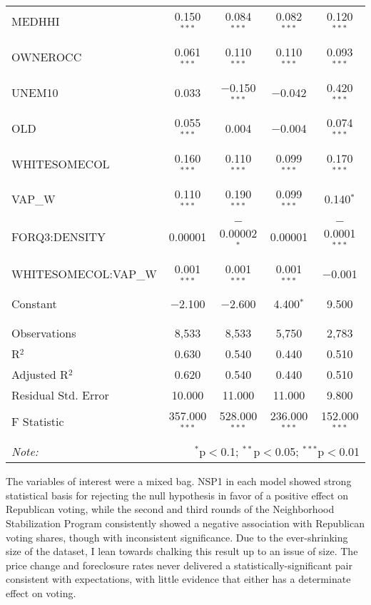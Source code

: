 \documentclass[
]{article}
\begin{document}
\begin{table}[!htbp]
\begin{tabular}{@{\extracolsep{3pt}}lcccc}
 MEDHHI & 0.150$^{***}$ & 0.084$^{***}$ & 0.082$^{***}$ & 0.120$^{***}$ \\
  & & & & \\
 OWNEROCC & 0.061$^{***}$ & 0.110$^{***}$ & 0.110$^{***}$ & 0.093$^{***}$ \\
  & & & & \\
 UNEM10 & 0.033 & $-$0.150$^{***}$ & $-$0.042 & 0.420$^{***}$ \\
  & & & & \\
 OLD & 0.055$^{***}$ & 0.004 & $-$0.004 & 0.074$^{***}$ \\
  & & & & \\
 WHITESOMECOL & 0.160$^{***}$ & 0.110$^{***}$ & 0.099$^{***}$ & 0.170$^{***}$ \\
  & & & & \\
 VAP\_W & 0.110$^{***}$ & 0.190$^{***}$ & 0.099$^{***}$ & 0.140$^{*}$ \\
  & & & & \\
 FORQ3:DENSITY & 0.00001 & $-$0.00002$^{*}$ & 0.00001 & $-$0.0001$^{***}$ \\
  & & & & \\
 WHITESOMECOL:VAP\_W & 0.001$^{***}$ & 0.001$^{***}$ & 0.001$^{***}$ & $-$0.001 \\
  & & & & \\
 Constant & $-$2.100 & $-$2.600 & 4.400$^{*}$ & 9.500 \\
  & & & & \\
\hline \\[-1.8ex]
Observations & 8,533 & 8,533 & 5,750 & 2,783 \\
R$^{2}$ & 0.630 & 0.540 & 0.440 & 0.510 \\
Adjusted R$^{2}$ & 0.620 & 0.540 & 0.440 & 0.510 \\
Residual Std. Error & 10.000 & 11.000 & 11.000 & 9.800 \\
F Statistic & 357.000$^{***}$ & 528.000$^{***}$ & 236.000$^{***}$ & 152.000$^{***}$ \\
\hline
\hline \\[-1.8ex]
\textit{Note:}  & \multicolumn{4}{r}{$^{*}$p$<$0.1; $^{**}$p$<$0.05; $^{***}$p$<$0.01} \\
\end{tabular}
\end{table}

The variables of interest were a mixed bag.
NSP1 in each model showed strong statistical basis for rejecting the null hypothesis in favor of a positive effect on Republican voting, while the second and third rounds of the Neighborhood Stabilization Program consistently showed a negative association with Republican voting shares, though with inconsistent significance.
Due to the ever-shrinking size of the dataset, I lean towards chalking this result up to an issue of size.
The price change and foreclosure rates never delivered a statistically-significant pair consistent with expectations, with little evidence that either has a determinate effect on voting.
\end{document}
